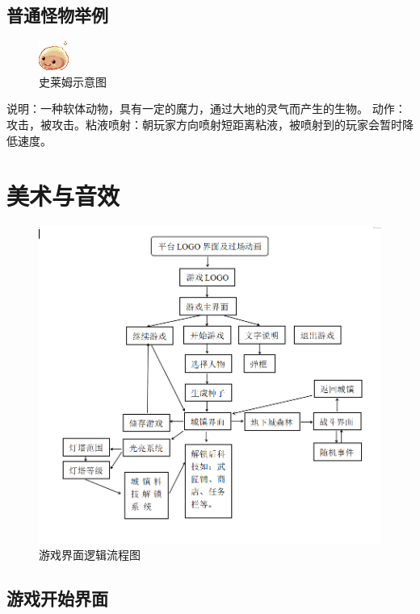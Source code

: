 \documentclass[UTF8,AutoFakeBold=1,AutoFakeSlant,zihao=-4]{cucthesis}
\begin{document}
\subsection{普通怪物举例}

\begin{figure}[ht]
    \centering
    \includegraphics[scale=1.0]{imgs/史莱姆.png}    
    \caption{史莱姆示意图}
\end{figure}

说明：一种软体动物，具有一定的魔力，通过大地的灵气而产生的生物。
动作：攻击，被攻击。粘液喷射：朝玩家方向喷射短距离粘液，被喷射到的玩家会暂时降低速度。


\section{美术与音效}

\begin{figure}[ht]
    \centering
    \includegraphics[scale=0.5]{imgs/界面流程图.png}    
    \caption{游戏界面逻辑流程图}
\end{figure}

\subsection{游戏开始界面}
\end{document}
